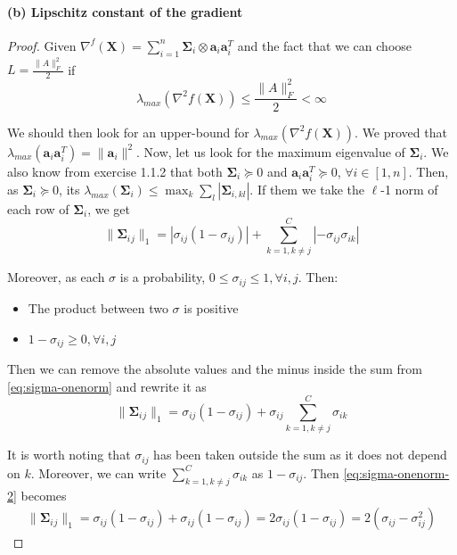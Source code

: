 \documentclass[12pt]{article}
\newcommand{\boldX}{\mathbf{X}}
\newcommand{\aat}{\mathbf{a}_{i} \mathbf{a}_{i}^{T}}
\newcommand{\bigsigma}{\mathbf{\Sigma}_{i}}
\begin{document}
\paragraph{(b) Lipschitz constant of the gradient}
\begin{proof}
Given $\nabla^f(\boldX) = \sum_{i=1}^{n} \bigsigma \otimes \aat$ and the fact that we can choose $L = \frac{\lVert A \rVert_{F}^{2}}{2}$ if
\begin{equation} \label{eq:L-condition}
    \lambda_{max}(\nabla^{2}f(\boldX)) \leq \frac{\lVert A \rVert_{F}^{2}}{2} < \infty
\end{equation}

We should then look for an upper-bound for $\lambda_{max}(\nabla^{2}f(\boldX))$. We proved that $\lambda_{max}(\aat) = \lVert \mathbf{a}_{i} \rVert ^{2}$. Now, let us look for the maximum eigenvalue of $\bigsigma$. We also know from exercise 1.1.2 that both $\bigsigma \succeq 0$ and $\aat \succeq 0$, $\forall i \in [1, n]$. Then, as $\bigsigma \succeq 0$, its $\lambda_{max}(\bigsigma) \leq \max_{k} \sum_{l} |\mathbf{\Sigma}_{i,kl}|$. If them we take the $\ell$-1 norm of each row of $\bigsigma$, we get
\begin{equation} \label{eq:sigma-onenorm}
\lVert \bigsigma{}_{j} \rVert_{1} = |\sigma_{ij}(1 - \sigma_{ij})| + \sum_{k=1,k \neq j}^{C} | -\sigma_{ij}\sigma_{ik}| 
\end{equation}

Moreover, as each $\sigma$ is a probability, $0 \leq \sigma_{ij} \leq 1, \forall i,j$. Then:
\begin{itemize}
    \item The product between two $\sigma$ is positive
    \item $1 - \sigma_{ij} \geq 0, \forall i,j$
\end{itemize}
Then we can remove the absolute values and the minus inside the sum from \eqref{eq:sigma-onenorm} and rewrite it as
\begin{equation} \label{eq:sigma-onenorm-2}
    \lVert \bigsigma{}_{j} \rVert_{1} = \sigma_{ij}(1 - \sigma_{ij}) + \sigma_{ij} \sum_{k=1,k \neq j}^{C} \sigma_{ik}
\end{equation}

It is worth noting that $\sigma_{ij}$ has been taken outside the sum as it does not depend on $k$. Moreover, we can write $\sum_{k=1,k \neq j}^{C} \sigma_{ik}$ as $1 - \sigma_{ij}$. Then \eqref{eq:sigma-onenorm-2} becomes
\begin{gather} \label{eq:sigma-onenorm-3}
    \lVert \bigsigma{}_{j} \rVert_{1} = \sigma_{ij}(1 - \sigma_{ij}) + \sigma_{ij}(1 - \sigma_{ij}) = 2 \sigma_{ij}(1 - \sigma_{ij}) = 2(\sigma_{ij} - \sigma_{ij}^{2})
\end{gather}


\end{proof}
\end{document}
